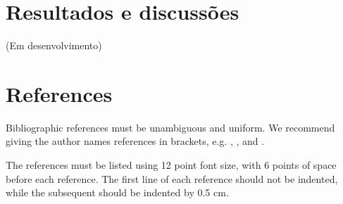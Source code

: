 \documentclass[12pt]{article}
\begin{document}
\section{Resultados e discussões}

(Em desenvolvimento)

\section{References}

Bibliographic references must be unambiguous and uniform.  We recommend giving
the author names references in brackets, e.g. \cite{knuth:84},
\cite{boulic:91}, and \cite{smith:99}.

The references must be listed using 12 point font size, with 6 points of space
before each reference. The first line of each reference should not be
indented, while the subsequent should be indented by 0.5 cm.



\end{document}
